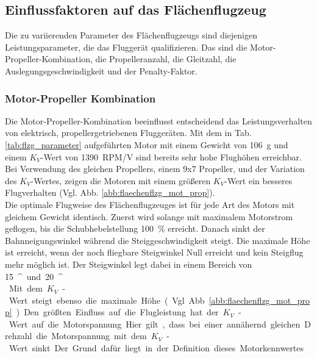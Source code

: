 

\subsection{Einflussfaktoren auf das Flächenflugzeug}
Die zu variierenden Parameter des Flächenflugzeugs sind diejenigen Leistungsparameter, die das Fluggerät qualifizieren. Das sind die Motor-Propeller-Kombination, die Propelleranzahl, die Gleitzahl, die Auslegungsgeschwindigkeit und der Penalty-Faktor.

\subsubsection{Motor-Propeller Kombination}
\label{subsubsec:mot_prop_kombi}
Die Motor-Propeller-Kombination beeinflusst entscheidend das Leistungsverhalten von elektrisch, propellergetriebenen Fluggeräten. Mit dem in Tab. \ref{tab:flzg_parameter} aufgeführten Motor mit einem Gewicht von \SI{106}{g} und einem \ensuremath{K_V}-Wert von \SI{1390}{RPM/V} sind bereits sehr hohe Flughöhen erreichbar. Bei Verwendung des gleichen Propellers, einem 9x7 Propeller, und der Variation des \ensuremath{K_V}-Wertes, zeigen die Motoren mit einem größeren \ensuremath{K_V}-Wert ein besseres Flugverhalten (Vgl. Abb. \ref{abb:flaechenflzg_mot_prop}).\\
Die optimale Flugweise des Flächenflugzeuges ist für jede Art des Motors mit gleichem Gewicht identisch. Zuerst wird solange mit maximalem Motorstrom geflogen, bis die Schubhebelstellung \SI{100}{\%} erreicht. Danach sinkt der Bahnneigungswinkel während die Steiggeschwindigkeit steigt. Die maximale Höhe ist erreicht, wenn der noch fliegbare Steigwinkel Null erreicht und kein Steigflug mehr möglich ist. Der Steigwinkel legt dabei in einem Bereich von \SI{15}{^\circ} und \SI{20}{^\circ}. \\
Mit dem \ensuremath{K_V}-Wert steigt ebenso die maximale Höhe (Vgl. Abb. \ref{abb:flaechenflzg_mot_prop}). Den größten Einfluss auf die Flugleistung hat der \ensuremath{K_V}-Wert auf die Motorspannung. Hier gilt, dass bei einer annähernd gleichen Drehzahl die Motorspannung mit dem \ensuremath{K_V}-Wert sinkt. Der Grund dafür liegt in der Definition dieses Motorkennwertes.\\

